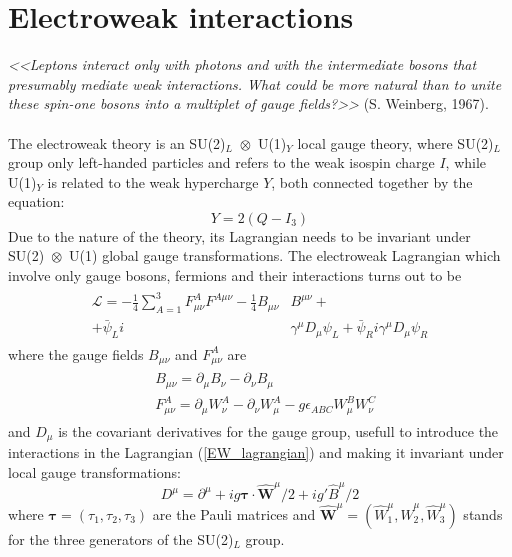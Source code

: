 \section{Electroweak interactions}
\emph{<<Leptons interact only with photons and with the intermediate bosons that presumably mediate weak interactions. What could be more natural than to unite these spin-one bosons
into a multiplet of gauge fields?>>} (S. Weinberg, 1967)\cite{PhysRevLett.19.1264}.
\\\\
The electroweak theory is an \mbox{SU(2)$_L$ $\otimes$ U(1)$_Y$} local gauge theory, where SU(2)$_L$ group only left-handed particles and refers to the weak isospin charge $I$, while U(1)$_Y$ is related to the weak hypercharge $Y$, both connected together by the equation:
\begin{equation}
Y = 2(Q-I_3)
\end{equation}
Due to the nature of the theory, its Lagrangian needs to be invariant under \mbox{SU(2) $\otimes$ U(1)} global gauge transformations.
The electroweak Lagrangian which involve only gauge bosons, fermions and their interactions turns out to be
\begin{align}
\begin{split}
\mathcal{L} = - \frac{1}{4} \displaystyle\sum_{A=1}^3F_{\mu\nu}^AF^{A\mu\nu} - \frac{1}{4} B_{\mu\nu}&B^{\mu\nu} + \\ 
 + \bar{\psi}_Li&\gamma^{\mu}D_{\mu}\psi_L + \bar{\psi}_Ri\gamma^{\mu}D_{\mu}\psi_R
 \end{split}
\label{EW_lagrangian}
\end{align}
where the gauge fields $B_{\mu\nu}$ and $F_{\mu\nu}^A$ are
\begin{align}
\begin{split}
&B_{\mu\nu} = \partial_{\mu}B_{\nu} - \partial_{\nu}B_{\mu} \\
&F_{\mu\nu}^A = \partial_{\mu}W_{\nu}^A - \partial_{\nu}W_{\mu}^A - g\epsilon_{ABC}W_{\mu}^BW_{\nu}^C
\end{split}
\end{align}
and $D_{\mu}$ is the covariant derivatives for the gauge group, usefull to introduce the interactions in the Lagrangian (\ref{EW_lagrangian}) and making it invariant under local gauge transformations:
\begin{equation}
D^{\mu} = \partial^{\mu} + ig \boldsymbol{\tau} \cdot \hat{\boldsymbol{W}}^{\mu} /2+ig'\hat{B}^{\mu} /2
\end{equation}
where $\boldsymbol{\tau} = (\tau_1, \tau_2, \tau_3)$ are the Pauli matrices and $\hat{\boldsymbol{W}}^{\mu} = (\hat{W}_1^{\mu}, \hat{W}_2^{\mu}, \hat{W}_3^{\mu})$ stands for the three generators of the SU(2)$_L$ group. 
